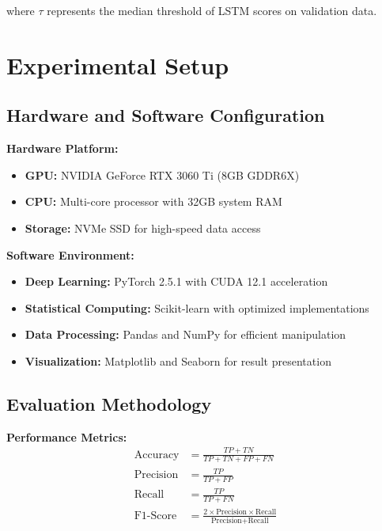 \documentclass[conference]{IEEEtran}
\begin{document}
where $\tau$ represents the median threshold of LSTM scores on validation data.

\section{Experimental Setup}

\subsection{Hardware and Software Configuration}

\textbf{Hardware Platform:}
\begin{itemize}
\item \textbf{GPU:} NVIDIA GeForce RTX 3060 Ti (8GB GDDR6X)
\item \textbf{CPU:} Multi-core processor with 32GB system RAM
\item \textbf{Storage:} NVMe SSD for high-speed data access
\end{itemize}

\textbf{Software Environment:}
\begin{itemize}
\item \textbf{Deep Learning:} PyTorch 2.5.1 with CUDA 12.1 acceleration
\item \textbf{Statistical Computing:} Scikit-learn with optimized implementations
\item \textbf{Data Processing:} Pandas and NumPy for efficient manipulation
\item \textbf{Visualization:} Matplotlib and Seaborn for result presentation
\end{itemize}

\subsection{Evaluation Methodology}

\textbf{Performance Metrics:}
\begin{align}
\text{Accuracy} &= \frac{TP + TN}{TP + TN + FP + FN} \\
\text{Precision} &= \frac{TP}{TP + FP} \\
\text{Recall} &= \frac{TP}{TP + FN} \\
\text{F1-Score} &= \frac{2 \times \text{Precision} \times \text{Recall}}{\text{Precision} + \text{Recall}}
\end{align}
\end{document}

